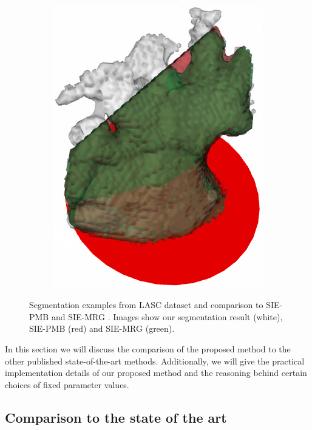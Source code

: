 \documentclass[review]{elsarticle}
\begin{document}
\begin{figure}[t]
\begin{subfigure}[b]{.16\linewidth}
    \includegraphics[width=\textwidth]{fig15_6.png}
    \caption{}\label{fig:siemens_b011}
  \end{subfigure}%

  \caption{ Segmentation examples from LASC dataset and comparison to 
    SIE-PMB \cite{zheng2008_FourChamberHeartModeling} and SIE-MRG
    \cite{zheng2014_Multipartmodelingsegmentation}. Images show 
    our segmentation result (white), SIE-PMB (red) and SIE-MRG (green).
  }

  \label{fig:siemens}
\end{figure}


  In this section we will discuss the comparison of the proposed method to the 
  other published state-of-the-art methods. Additionally, we will give 
  the practical implementation details of our
  proposed method and the reasoning behind certain choices of fixed parameter
  values. 

\subsection{Comparison to the state of the art}
  
\end{document}
